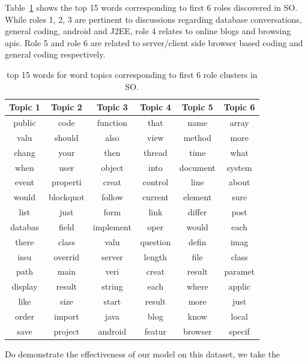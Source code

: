 \documentclass{sig-alternate}
\begin{document}
Table~\ref{tab:top15WordsSO} shows the top 15 words corresponding to first 6
roles discovered in SO. While roles 1, 2, 3 are pertinent to discussions
regarding database conversations, general coding, android
and J2EE, role 4 relates to online blogs and browsing apis. Role 5 and role 6
are related to server/client side browser based coding and general coding
respectively.

\begin{table}
\begin{center} 
\begin{tabular}{c|c|c|c|c|c}
Topic 1  & Topic 2 & Topic 3 & Topic 4 & Topic 5 & Topic 6 \\\hline
public  &code   &function       &that   &name   &array \\\hline
valu    &should &also   &view   &method &more \\\hline
chang   &your   &then   &thread &time   &what \\\hline
when    &user   &object &into   &document       &system \\\hline
event   &properti       &creat  &control        &line   &about \\\hline
would   &blockquot      &follow &current        &element        &sure \\\hline
list    &just   &form   &link   &differ &post \\\hline
databas &field  &implement      &oper   &would  &each \\\hline
there   &class  &valu   &question       &defin  &imag \\\hline
issu    &overrid        &server &length &file   &class \\\hline
path    &main   &veri   &creat  &result &paramet \\\hline
display &result &string &each   &where  &applic \\\hline
like    &size   &start  &result &more   &just \\\hline
order   &import &java   &blog   &know   &local \\\hline
save    &project        &android        &featur &browser        &specif \\\hline
\end{tabular}%
\caption{top 15 words for word topics corresponding to first 6 role clusters in
SO.}
\label{tab:top15WordsSO}
\end{center}
\end{table}
Do demonstrate the effectiveness of our model on this dataset, we take the
\end{document}
